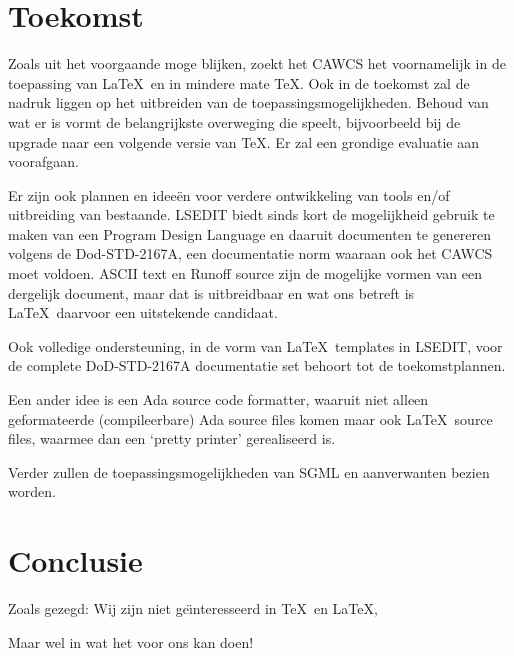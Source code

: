 \section{Toekomst}

Zoals uit het voorgaande moge blijken, zoekt het CAWCS het voornamelijk in de
toepassing van \LaTeX\ en in mindere mate \TeX. Ook in de toekomst zal de nadruk
liggen op het uitbreiden van de toepassingsmogelijkheden.  Behoud van wat er is
vormt de belangrijkste overweging die speelt, bijvoorbeeld bij de upgrade naar
een volgende versie van \TeX. Er zal een grondige evaluatie aan voorafgaan.

Er zijn ook plannen en idee\"en voor verdere ontwikkeling van tools en/of
uitbreiding van bestaande. LSEDIT biedt sinds kort de mogelijkheid gebruik te
maken van een Program Design Language en daaruit documenten te genereren volgens
de Dod-STD-2167A, een documentatie norm waaraan ook het CAWCS moet voldoen.
ASCII text en Runoff source zijn de mogelijke vormen van een dergelijk document,
maar dat is uitbreidbaar en wat ons betreft is \LaTeX\ daarvoor een uitstekende
candidaat.

Ook volledige ondersteuning, in de vorm van \LaTeX\ templates in LSEDIT, voor de
complete DoD-STD-2167A documentatie set behoort tot de toekomstplannen.

Een ander idee is een Ada source code formatter, waaruit niet alleen
geformateerde (compileerbare) Ada source files komen maar ook \LaTeX\ source
files, waarmee dan een `pretty printer' gerealiseerd is.

Verder zullen de toepassingsmogelijkheden van SGML en aanverwanten bezien
worden.

\section{Conclusie}

Zoals gezegd: Wij zijn niet ge\"{\i}nteresseerd in \TeX\ en \LaTeX,

\vspace{2cm}

\begin{center}
{\LARGE Maar wel in wat het voor ons kan doen!}
\end{center}


